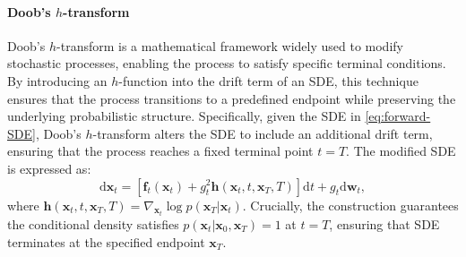 \paragraph{Doob's $h$-transform}
% 
Doob’s $h$-transform is a mathematical framework widely used to modify stochastic processes, enabling the process to satisfy specific terminal conditions. By introducing an $h$-function into the drift term of an SDE, this technique ensures that the process transitions to a predefined endpoint while preserving the underlying probabilistic structure.
%
Specifically, given the SDE in \cref{eq:forward-SDE}, Doob’s $h$-transform alters the SDE to include an additional drift term, ensuring that the process reaches a fixed terminal point $t=T$. 
The modified SDE is expressed as:
\begin{equation}
\mathrm{d}\mathbf{x}_t=[\mathbf{f}_t\left(\mathbf{x}_t\right)+g_t^2 \bm{h}(\mathbf{x}_t,t,\mathbf{x}_T,T)]\mathrm{d}t+g_t\mathrm{d}\mathbf{w}_t,
\end{equation}
where $\bm{h}(\mathbf{x}_t,t,\mathbf{x}_T,T)=\nabla_{\mathbf{x}_t} \log p(\mathbf{x}_T| \mathbf{x}_t)$. Crucially, the construction guarantees the conditional density satisfies $p(\mathbf{x}_t|\mathbf{x}_0,\mathbf{x}_T)=1$ at $t=T$, ensuring that SDE terminates at the specified endpoint $\mathbf{x}_T$.







